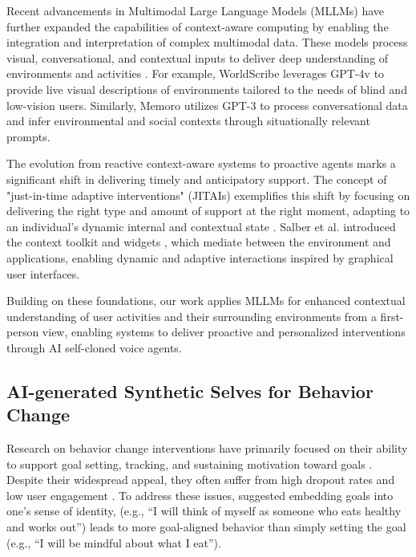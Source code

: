 Recent advancements in Multimodal Large Language Models (MLLMs) have further expanded the capabilities of context-aware computing by enabling the integration and interpretation of complex multimodal data. These models process visual, conversational, and contextual inputs to deliver deep understanding of environments and activities \cite{radford2021learningtransferablevisualmodels, Jia2021, Alayrac2022}. For example, WorldScribe \cite{Chang_2024} leverages GPT-4v \cite{openai_vision_guide} to provide live visual descriptions of environments tailored to the needs of blind and low-vision users. Similarly, Memoro \cite{10.1145/3613904.3642450} utilizes GPT-3 \cite{brown2020languagemodelsfewshotlearners} to process conversational data and infer environmental and social contexts through situationally relevant prompts.

The evolution from reactive context-aware systems to proactive agents marks a significant shift in delivering timely and anticipatory support. The concept of "just-in-time adaptive interventions" (JITAIs) exemplifies this shift by focusing on delivering the right type and amount of support at the right moment, adapting to an individual’s dynamic internal and contextual state \cite{nahum2018just, orzikulova2024time2stop}. Salber et al. introduced the context toolkit and widgets \cite{salber1999context}, which mediate between the environment and applications, enabling dynamic and adaptive interactions inspired by graphical user interfaces.

Building on these foundations, our work applies MLLMs for enhanced contextual understanding of user activities and their surrounding environments from a first-person view, enabling systems to deliver proactive and personalized interventions through AI self-cloned voice agents.

\subsection{AI-generated Synthetic Selves for Behavior Change}
Research on behavior change interventions have primarily focused on their ability to support goal setting, tracking, and sustaining motivation toward goals \cite{lolla2023evaluating}. Despite their widespread appeal, they often suffer from high dropout rates and low user engagement \cite{lazar2015we}. To address these issues, \citet{dominick2020goals} suggested embedding goals into one’s sense of identity, (e.g., ``I will think of myself as someone who eats healthy and works out'') leads to more goal-aligned behavior than simply setting the goal (e.g., ``I will be mindful about what I eat''). 

